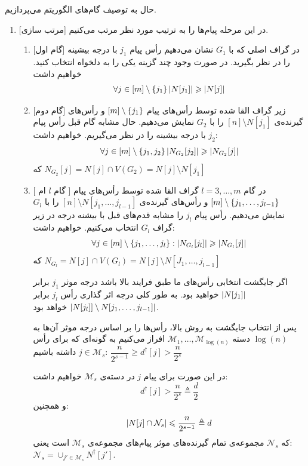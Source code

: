 حال به توصیف گام‌های الگوریتم می‌پردازیم.
\begin{enumerate}
    \item{[مرتب سازی]}
    در این مرحله پیام‌ها را به ترتیب مورد نظر مرتب می‌کنیم.
    \begin{enumerate}
        \item{[گام اول]}
        در گراف اصلی که با
        $G_1$
        نشان می‌دهیم رأس پیام
        $j_1$
        با درجه بیشینه را در نظر بگیرید. در صورت وجود چند گزینه یکی را به دلخواه انتخاب کنید. خواهیم داشت
        $$\forall j \in [m] \setminus \left\{ j_1 \right\} \left|{N[j_1]}\right| \geqslant \left|{N[j]}\right|$$
        \item{[گام دوم]}
        زیر گراف القا شده توسط رأس‌های پیام
        $[m] \setminus \left\{ j_1 \right\}$
        و رأس‌های گیرنده‌ی
        $[n] \setminus N[j_1]$
        را با
        $G_2$
        نمایش می‌دهیم. حال مشابه گام قبل رأس پیام
        $j_2$
        با درجه بیشینه را در نظر می‌گیریم. خواهیم داشت:
        $$\forall j \in [m] \setminus \left\{ j_1, j_2 \right\} \left|{N_{G_2}[j_2]}\right| \geqslant \left|{N_{G_2}[j]}\right|$$
        که
        $N_{G_2}[j] = N[j] \cap V(G_2) = N[j] \setminus N[j_1]$
        \item{[
            گام $l$ ام
            ]}
        در گام
        $l = 3, \ldots, m$
        گراف القا شده توسط رأس‌های پیام
        $[m] \setminus \left\{ j_1, \ldots, j_{l - 1} \right\}$
        و رأس‌های گیرنده‌ی
        $[n] \setminus N[j_1, \ldots, j_{l-1} ]$
        را با
        $G_l$
        نمایش می‌دهیم. رأس پیام
        $j_l$
        را مشابه قدم‌های قبل با بیشنه درجه در زیر گراف
        $G_l$
        انتخاب می‌کنیم. خواهیم داشت:
        $$\forall j \in [m] \setminus \left\{ j_1, \ldots, j_l \right\}: \left|{N_{G_l}[j_l]}\right| \geqslant \left|{N_{G_l} [j]}\right|$$
        که
        $N_{G_l} = N[j] \cap V(G_l) = N[j] \setminus N[J_1, \ldots, j_{l - 1}] $

        اگر جایگشت انتخابی رأس‌های ما طبق فرایند بالا باشد درجه موثر
        $j_1$
        برابر
        $\left|{N[j_1]}\right|$
        خواهید بود. به طور کلی درجه اثر گذاری رأس
        $j_l$
        برابر
        $\left|{N[j_l]]\setminus N[j_1, \ldots, j_{l-1}]}\right|$
        خواهد بود.

        پس از انتخاب جایگشت به روش بالا، رأس‌ها را بر اساس درجه موثر آن‌ها به
        $\log(n)$
        دسته
        $\mathcal{M}_1, \ldots, \mathcal{M}_{\log(n)}$
        افراز می‌کنیم به گونه‌ای که برای رأس
        $j \in \mathcal{M}_s$
        داشته باشیم:
        $\dfrac{n}{2^{s - 1}} \geq d^\dagger[j] > \dfrac{n}{2^s}$

        در این صورت برای پیام
        $j$
        در دسته‌ی
        $\mathcal{M}_s$
        خواهیم داشت:
        $$d^{\dagger}[j] > \dfrac{n}{2^s} \triangleq \dfrac{d}{2}$$
        و همچنین:
        $$\left|{N[j] \cap \mathcal{N}_s}\right| \leqslant \dfrac{n}{2^{s - 1}} \triangleq d$$
        که
        $\mathcal{N}_s$
        مجموعه‌ی تمام گیرنده‌های موثر پیام‌های مجموعه‌ی
        $\mathcal{M}_s$
        است یعنی:
        $\mathcal{N}_s = \cup_{j' \in \mathcal{M}_s} N^{\dagger}[j']$.


\end{enumerate}
\end{enumerate}
